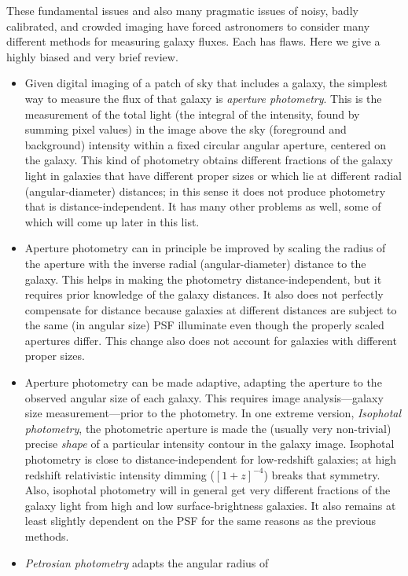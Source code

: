 \documentclass[12pt,preprint,pdftex]{aastex}
\begin{document}
These fundamental issues and also many pragmatic issues of noisy,
badly calibrated, and crowded imaging have forced astronomers to
consider many different methods for measuring galaxy fluxes.  Each has
flaws.  Here we give a highly biased and very brief review.
\begin{itemize}
\item Given digital imaging of a patch of sky that includes a galaxy,
  the simplest way to measure the flux of that galaxy is
  \emph{aperture photometry}.  This is the measurement of the total
  light (the integral of the intensity, found by summing pixel values)
  in the image above the sky (foreground and background) intensity
  within a fixed circular angular aperture, centered on the galaxy.
  This kind of photometry obtains different fractions of the galaxy
  light in galaxies that have different proper sizes or which lie at
  different radial (angular-diameter) distances; in this sense it
  does not produce photometry that is distance-independent.  It has
  many other problems as well, some of which will come up later in
  this list.
\item Aperture photometry can in principle be improved by scaling the
  radius of the aperture with the inverse radial (angular-diameter)
  distance to the galaxy.  This helps in making the photometry
  distance-independent, but it requires prior knowledge of the galaxy
  distances.  It also does not perfectly compensate for distance
  because galaxies at different distances are subject to the same (in
  angular size) PSF illuminate even though the properly scaled apertures
  differ.  This change also does not account for galaxies with
  different proper sizes.
\item Aperture photometry can be made adaptive, adapting the aperture
  to the observed angular size of each galaxy.  This requires image
  analysis---galaxy size measurement---prior to the photometry.  In
  one extreme version, \emph{Isophotal photometry}, the photometric
  aperture is made the (usually very non-trivial) precise \emph{shape}
  of a particular intensity contour in the galaxy image.  Isophotal
  photometry is close to distance-independent for low-redshift
  galaxies; at high redshift relativistic intensity dimming
  ($[1+z]^{-4}$) breaks that symmetry.  Also, isophotal photometry
  will in general get very different fractions of the galaxy light
  from high and low surface-brightness galaxies.  It also remains at
  least slightly dependent on the PSF for the same reasons as the
  previous methods.
\item \emph{Petrosian photometry} \citep{petrosian} adapts the angular radius of

\end{itemize}
\end{document}
